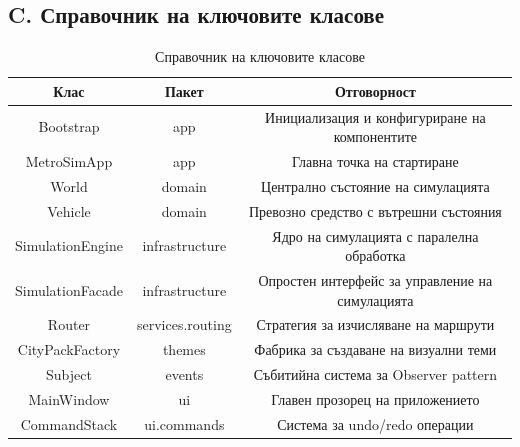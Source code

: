 \documentclass{article}
\begin{document}
\subsection*{C. Справочник на ключовите класове}

\begin{table}[H]
	\centering
	\small
	\begin{tabular}{|c|c|c|}
		\hline
		\textbf{Клас} & \textbf{Пакет} & \textbf{Отговорност} \\
		\hline
		Bootstrap & app & Инициализация и конфигуриране на компонентите \\
		\hline
		MetroSimApp & app & Главна точка на стартиране \\
		\hline
		World & domain & Централно състояние на симулацията \\
		\hline
		Vehicle & domain & Превозно средство с вътрешни състояния \\
		\hline
		SimulationEngine & infrastructure & Ядро на симулацията с паралелна обработка \\
		\hline
		SimulationFacade & infrastructure & Опростен интерфейс за управление на симулацията \\
		\hline
		Router & services.routing & Стратегия за изчисляване на маршрути \\
		\hline
		CityPackFactory & themes & Фабрика за създаване на визуални теми \\
		\hline
		Subject & events & Събитийна система за Observer pattern \\
		\hline
		MainWindow & ui & Главен прозорец на приложението \\
		\hline
		CommandStack & ui.commands & Система за undo/redo операции \\
		\hline
	\end{tabular}
	\caption{Справочник на ключовите класове}
\end{table}
\end{document}
